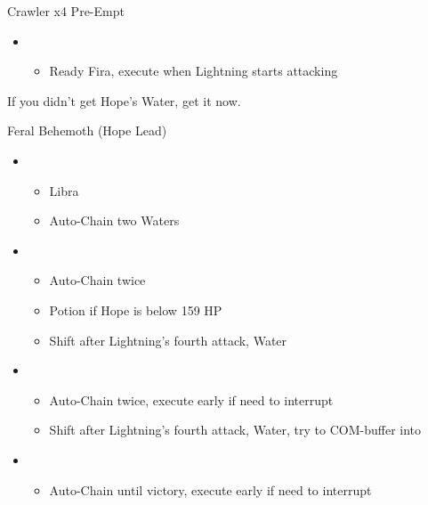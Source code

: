 	\begin{battle}[0:05]{Crawler x4 Pre-Empt}
		\begin{itemize}
			\item \first
			      \begin{itemize}
				      \item Ready Fira, execute when Lightning starts attacking
			      \end{itemize}
		\end{itemize}
	\end{battle}
	If you didn't get Hope's Water, get it now.
	\vfill
	\begin{battle}[0:39]{Feral Behemoth (Hope Lead)}
		\begin{itemize}
			\item \first
			      \begin{itemize}
				      \item Libra
				      \item Auto-Chain two Waters
			      \end{itemize}
			\item \fourth
			      \begin{itemize}
				      \item Auto-Chain twice
				      \item Potion if Hope is below 159 HP
				      \item Shift after Lightning's fourth attack, Water
			      \end{itemize}
			\item \fifth
			      \begin{itemize}
				      \item Auto-Chain twice, execute early if need to interrupt
				      \item Shift after Lightning's fourth attack, Water, try to COM-buffer into
			      \end{itemize}
			\item \sixth
			      \begin{itemize}
				      \item Auto-Chain until victory, execute early if need to interrupt
			      \end{itemize}
		\end{itemize}
	\end{battle}

